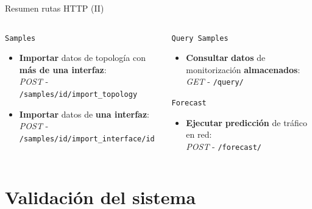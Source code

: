 \documentclass[aspectratio=169,xcolor=dvipsnames]{beamer}
\begin{document}
	\begin{frame}{Resumen rutas HTTP (II)}
		\begin{columns}
			\begin{column}{0.5\textwidth}
				\begin{block}{\texttt{Samples}}
					\begin{itemize}
						\item \textbf{Importar} datos de topología con \textbf{más de una interfaz}: \\ \textit{\small POST} - \texttt{\small /samples/id/import\_topology}
						
						\item \textbf{Importar} datos de \textbf{una interfaz}: \\ \textit{POST} - \texttt{\small /samples/id/import\_interface/id}
					\end{itemize}
				\end{block}
			\end{column}
		
			\begin{column}{0.5\textwidth}
				\begin{block}{\texttt{Query Samples}}
					\begin{itemize}
						\item \textbf{Consultar} \textbf{datos} de monitorización \textbf{almacenados}: \\ \textit{GET} - \texttt{\small /query/}
					\end{itemize}
				\end{block}
			
				\begin{block}{\texttt{Forecast}}
					\begin{itemize}
						\item \textbf{Ejecutar} \textbf{predicción} de tráfico en red: \\ \textit{POST} - \texttt{\small /forecast/}
					\end{itemize}
				\end{block}
			\end{column}
		\end{columns}
	\end{frame}
	
	
	\section{Validación del sistema}
	
\end{document}
